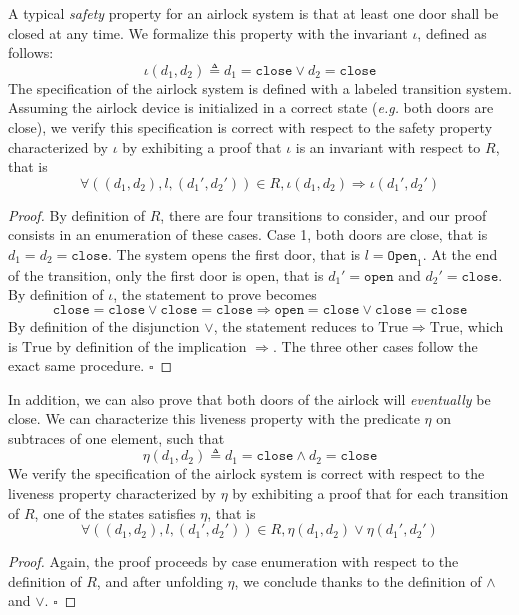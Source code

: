 \begin{example}
  A typical \emph{safety} property for an airlock system is that at least one
  door shall be closed at any time.
  We formalize this property with the invariant \( \iota \), defined as follows:
  \[
    \iota( d_1, d_2) \triangleq d_1 = \mathtt{close} \vee d_2 = \mathtt{close}
  \]
  The specification of the airlock system is defined with a labeled transition
  system.
  Assuming the airlock device is initialized in a correct state (\emph{e.g.}
  both doors are close), we verify this specification is correct with respect to
  the safety property characterized by \( \iota \) by exhibiting a proof that
  \( \iota \) is an invariant with respect to \( R \), that is
  \[
    \forall ((d_1, d_2), l, (d_1', d_2')) \in R, \iota(d_1, d_2) \Rightarrow
    \iota(d_1', d_2')
  \]

  \begin{proof}
    By definition of \( R \), there are four transitions to consider, and our
    proof consists in an enumeration of these cases.
    Case 1, both doors are close, that is \( d_1 = d_2 = \mathtt{close} \).  The
    system opens the first door, that is \( l = \mathtt{Open}_1 \). At the end
    of the transition, only the first door is open, that is
    \( d_1' = \mathtt{open} \) and \( d_2' = \mathtt{close} \).
    By definition of \( \iota \), the statement to prove becomes
    \[
      \mathtt{close} = \mathtt{close} \vee \mathtt{close} = \mathtt{close}
      \Rightarrow \mathtt{open} = \mathtt{close} \vee \mathtt{close} =
      \mathtt{close}
    \]
    By definition of the disjunction \( \vee \), the statement reduces to
    \( \mathrm{True} \Rightarrow \mathrm{True} \), which is \( \mathrm{True} \)
    by definition of the implication \( \Rightarrow \).
    The three other cases follow the exact same procedure.
    \hfill \( \square \)
  \end{proof}

  In addition, we can also prove that both doors of the airlock will
  \emph{eventually} be close.
  We can characterize this liveness property with the predicate \( \eta \) on
  subtraces of one element, such that
  \[
    \eta(d_1, d_2) \triangleq d_1 = \mathtt{close} \wedge d_2 = \mathtt{close}
  \]
  We verify the specification of the airlock system is correct with respect to
  the liveness property characterized by \( \eta \) by exhibiting a proof that
  for each transition of \( R \), one of the states satisfies \( \eta \), that
  is
  \[
    \forall ((d_1, d_2), l, (d_1', d_2')) \in R, \eta(d_1, d_2) \vee \eta(d_1',
    d_2')
  \]

  \begin{proof}
    Again, the proof proceeds by case enumeration with respect to the definition
    of \( R \), and after unfolding \( \eta \), we conclude thanks to the
    definition of \( \wedge \) and \( \vee \).
    \hfill \( \square \)
  \end{proof}
\end{example}

